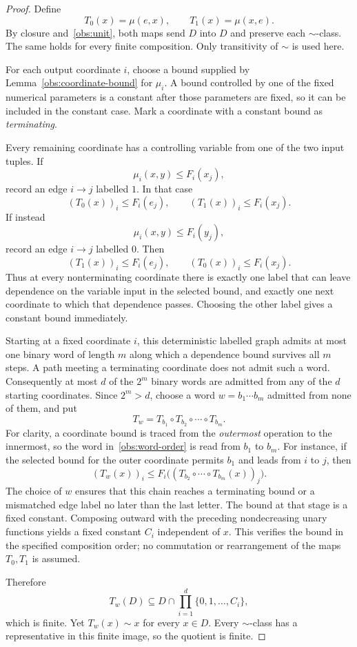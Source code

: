 \begin{proof}
Define
\[
                    T_0(x)=\mu(e,x),\qquad T_1(x)=\mu(x,e).
\]
By closure and~\eqref{obs:unit}, both maps send $D$ into $D$ and preserve
each $\sim$-class. The same holds for every finite composition. Only
transitivity of $\sim$ is used here.

For each output coordinate $i$, choose a bound supplied by
Lemma~\ref{obs:coordinate-bound} for $\mu_i$. A bound controlled by one
of the fixed numerical parameters is a constant after those parameters
are fixed, so it can be included in the constant case. Mark a coordinate
with a constant bound as \emph{terminating}.

Every remaining coordinate has a controlling variable from one of the
two input tuples. If
\[
                 \mu_i(x,y)\le F_i(x_j),
\]
record an edge $i\longrightarrow j$ labelled $1$. In that case
\[
                 (T_0(x))_i\le F_i(e_j),\qquad
                 (T_1(x))_i\le F_i(x_j).
                 \tag{First input}\label{obs:first-input}
\]
If instead
\[
                 \mu_i(x,y)\le F_i(y_j),
\]
record an edge $i\longrightarrow j$ labelled $0$. Then
\[
                 (T_1(x))_i\le F_i(e_j),\qquad
                 (T_0(x))_i\le F_i(x_j).
                 \tag{Second input}\label{obs:second-input}
\]
Thus at every nonterminating coordinate there is exactly one label that
can leave dependence on the variable input in the selected bound, and
exactly one next coordinate to which that dependence passes. Choosing
the other label gives a constant bound immediately.

Starting at a fixed coordinate $i$, this deterministic labelled graph
admits at most one binary word of length $m$ along which a dependence
bound survives all $m$ steps. A path meeting a terminating coordinate
does not admit such a word. Consequently at most $d$ of the $2^m$ binary
words are admitted from any of the $d$ starting coordinates. Since
$2^m>d$, choose a word $w=b_1\cdots b_m$ admitted from none of them, and
put
\[
                T_w=T_{b_1}\circ T_{b_2}\circ\cdots\circ T_{b_m}.
                \tag{Composition order}\label{obs:word-order}
\]
For clarity, a coordinate bound is traced from the \emph{outermost}
operation to the innermost, so the word in~\eqref{obs:word-order} is read
from $b_1$ to $b_m$. For instance, if the selected bound for the outer
coordinate permits $b_1$ and leads from $i$ to $j$, then
\[
 (T_w(x))_i\le F_i\bigl((T_{b_2}\circ\cdots\circ T_{b_m}(x))_j\bigr).
\]
The choice of $w$ ensures that this chain reaches a terminating bound or
a mismatched edge label no later than the last letter. The bound at
that stage is a fixed constant. Composing outward with the preceding
nondecreasing unary functions yields a fixed constant $C_i$ independent
of $x$. This verifies the bound in the specified composition order; no
commutation or rearrangement of the maps $T_0,T_1$ is assumed.

Therefore
\[
           T_w(D)\subseteq
           D\cap\prod_{i=1}^{d}\{0,1,\ldots,C_i\},
\]
which is finite. Yet $T_w(x)\sim x$ for every $x\in D$. Every
$\sim$-class has a representative in this finite image, so the quotient
is finite.
\end{proof}

